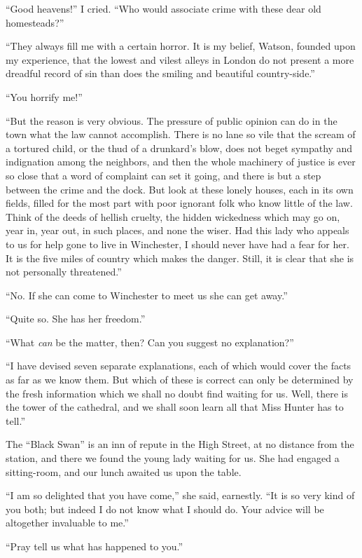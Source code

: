 “Good heavens!” I cried. “Who would associate crime
with these dear old homesteads?”

“They always fill me with a certain horror. It is my belief,
Watson, founded upon my experience, that the lowest and
vilest alleys in London do not present a more dreadful record
of sin than does the smiling and beautiful country-side.”

“You horrify me!”

“But the reason is very obvious. The pressure of public
opinion can do in the town what the law cannot accomplish.
There is no lane so vile that the scream of a tortured child, or
the thud of a drunkard’s blow, does not beget sympathy and
indignation among the neighbors, and then the whole machinery
of justice is ever so close that a word of complaint can set
it going, and there is but a step between the crime and the
dock. But look at these lonely houses, each in its own fields,
filled for the most part with poor ignorant folk who know little
of the law. Think of the deeds of hellish cruelty, the hidden
wickedness which may go on, year in, year out, in such places,
and none the wiser. Had this lady who appeals to us for help
gone to live in Winchester, I should never have had a fear for
her. It is the five miles of country which makes the danger.
Still, it is clear that she is not personally threatened.”

“No. If she can come to Winchester to meet us she can
get away.”

“Quite so. She has her freedom.”

“What \textit{can} be the matter, then? Can you suggest no explanation?”

“I have devised seven separate explanations, each of which
would cover the facts as far as we know them. But which of
these is correct can only be determined by the fresh information
which we shall no doubt find waiting for us. Well, there
is the tower of the cathedral, and we shall soon learn all that
Miss Hunter has to tell.”

The “Black Swan” is an inn of repute in the High Street,
at no distance from the station, and there we found the young
lady waiting for us. She had engaged a sitting-room, and our
lunch awaited us upon the table.

“I am so delighted that you have come,” she said, earnes\-tly.
“It is so very kind of you both; but indeed I do not know
what I should do. Your advice will be altogether invaluable
to me.”

“Pray tell us what has happened to you.”

